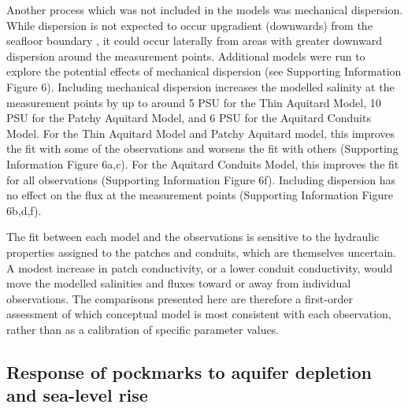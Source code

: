 \documentclass[draft, 10pt]{agujournal2019}
\begin{document}
Another process which was not included in the models was mechanical dispersion.
While dispersion is not expected to occur upgradient (downwards) from the seafloor boundary \cite{irvine_upstream_2021},
it could occur laterally from areas with greater downward dispersion around the measurement points.
Additional models were run to explore the potential effects of mechanical dispersion (see Supporting Information Figure 6).
Including mechanical dispersion increases the modelled salinity at the measurement points by up to around 5 PSU for the Thin Aquitard Model,
10 PSU for the Patchy Aquitard Model, and 6 PSU for the Aquitard Conduits Model.
For the Thin Aquitard Model and Patchy Aquitard model, this improves the fit with some of the observations and worsens the fit with others (Supporting Information Figure 6a,c).
For the Aquitard Conduits Model, this improves the fit for all observations (Supporting Information Figure 6f).
Including dispersion has no effect on the flux at the measurement points (Supporting Information Figure 6b,d,f).

The fit between each model and the observations is sensitive to the hydraulic properties assigned to the patches and conduits, which are themselves uncertain.
A modest increase in patch conductivity, or a lower conduit conductivity, would move the modelled salinities and fluxes toward or away from individual observations.
The comparisons presented here are therefore a first-order assessment of which conceptual model is most consistent with each observation,
rather than as a calibration of specific parameter values.

\subsection{Response of pockmarks to aquifer depletion and sea-level rise}
\end{document}
